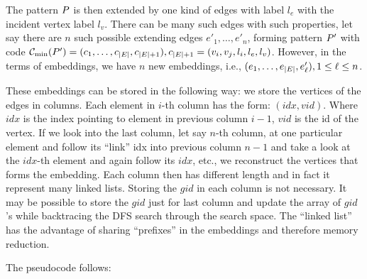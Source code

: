 The pattern $P$ is then extended by one kind of edges with
label $l_e$ with the incident vertex label $l_v$. There can be many
such edges with such properties, let say there are $n$ such possible
extending edges $e'_1,\ldots, e'_n$, forming pattern $P'$ with
code $\mindfscode(\pattern') = (c_1,\ldots, c_{|\E|},
c_{|\E|+1}), c_{|\E|+1}=(\vrtx_i, \vrtx_j, \lbl_i, \lbl_e,
\lbl_v)$. However, in the terms of embeddings, we have $n$ new
embeddings, i.e., $(e_1, \ldots, e_{|E|}, e'_{\ell}),
1\leq \ell\leq n$. 


These embeddings can be stored in the following way: we store the
vertices of the edges in columns. Each element in $i$-th column has the
form: $(idx, vid)$. Where $idx$ is the index pointing to element in
previous column $i-1$, $vid$ is the id of the vertex. If we look into
the last column, let say $n$-th column, at one particular element and
follow its ``link'' idx into previous column $n-1$ and take a look at
the $idx$-th element and again follow its $idx$, etc., we reconstruct
the vertices that forms the embedding. Each column then has different
length and in fact it represent many linked lists.  Storing the $gid$ in
each column is not necessary. It may be possible to store the $gid$
just for last column and update the array of $gid$'s while backtracing
the DFS search through the search space.  The ``linked list'' has the
advantage of sharing ``prefixes'' in the embeddings and therefore
memory reduction.
\fi



The pseudocode follows:

